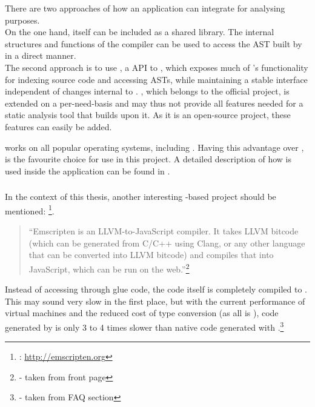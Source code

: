 There are two approaches of how an application can integrate  for analysing purposes.
\\On the one hand,  itself can be included as a shared library. The internal structures and functions of the compiler can be used to access the AST built by  in a direct manner.
\\The second approach is to use , a  API to , which exposes much of 's functionality for indexing source code and accessing ASTs, while maintaining a stable interface independent of changes internal to . , which belongs to the official  project, is extended on a per-need-basis and may thus not provide all features needed for a static analysis tool that builds upon it. As it is an open-source project, these features can easily be added.

 works on all popular operating systems, including . \linebreak Having this advantage over ,  is the favourite choice for use in this project. A detailed description of how  is used inside the application can be found in .

\subsubsection{}

In the context of this thesis, another interesting -based project should be \linebreak mentioned: \footnote{: \url{http://emscripten.org}}. 

\begin{quotation}
``Emscripten is an LLVM-to-JavaScript compiler. It takes LLVM bitcode (which can be generated from C/C++ using Clang, or any other language that can be converted into LLVM bitcode) and compiles that into JavaScript, which can be run on the web.''\footnote{\citep{EmscriptenHP} - taken from front page}
\end{quotation}

Instead of accessing  through glue code, the  code itself is completely compiled to . This may sound very slow in the first place, but with the current performance of  virtual machines and the reduced cost of type conversion (as all is ), code generated by  is only 3 to 4 times slower than native code generated with .\footnote{\citep{EmscriptenHP} - taken from FAQ section}